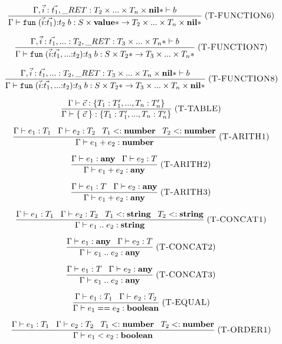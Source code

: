 \documentclass[12pt]{article}
\newcommand{\Top}{\mathbf{value}}
\newcommand{\Any}{\mathbf{any}}
\newcommand{\Nil}{\mathbf{nil}}
\newcommand{\Boolean}{\mathbf{boolean}}
\newcommand{\Number}{\mathbf{number}}
\newcommand{\String}{\mathbf{string}}
\newcommand{\kw}[1]{\mathbf{\texttt{#1}}}
\newcommand{\mylabel}[1]{\; (\textsc{#1})}
\newcommand{\subtype}{<:}
\newcommand{\env}{\Gamma}
\newcommand{\ret}{\string_RET}
\begin{document}
\[
\frac{\env, \vec{i}:\vec{t_{1}},
      \ret:T_{2} \times ... \times T_{n} \times \Nil{*} \vdash b}
     {\env \vdash \kw{fun} \; (\vec{i}{:}\vec{t_{1}}){:}t_{2} \; b :
      S \times \Top{*} \rightarrow T_{2} \times ... \times T_{n} \times \Nil{*}}
\mylabel{T-FUNCTION6}
\]

\[
\frac{\env, \vec{i}:\vec{t_{1}}, {...}:T_{2},
      \ret:T_{3} \times ... \times T_{n}* \vdash b}
     {\env \vdash \kw{fun} \; (\vec{i}{:}\vec{t_{1}},{...}{:}t_{2}){:}t_{3} \; b :
      S \times T_{2}* \rightarrow T_{3} \times ... \times T_{n}*}
\mylabel{T-FUNCTION7}
\]

\[
\frac{\env, \vec{i}:\vec{t_{1}}, {...}:T_{2},
      \ret:T_{3} \times ... \times T_{n} \times \Nil{*} \vdash b}
     {\env \vdash \kw{fun} \; (\vec{i}{:}\vec{t_{1}},{...}{:}t_{2}){:}t_{3} \; b :
      S \times T_{2}* \rightarrow T_{3} \times ... \times T_{n} \times \Nil{*}}
\mylabel{T-FUNCTION8}
\]

\[
\frac{\env \vdash \vec{c} : \{ T_{1}:T_{1}', ..., T_{n}:T_{n}' \}}
     {\env \vdash \{ \; \vec{c} \; \} : \{ T_{1}:T_{1}', ..., T_{n}:T_{n}' \}}
\mylabel{T-TABLE}
\]

\[
\frac{\env \vdash e_{1}:T_{1} \;\;\;
      \env \vdash e_{2}:T_{2} \;\;\;
      T_{1} \subtype \Number \;\;\;
      T_{2} \subtype \Number}
     {\env \vdash e_{1} + e_{2} : \Number}
\mylabel{T-ARITH1}
\]

\[
\frac{\env \vdash e_{1}:\Any \;\;\;
      \env \vdash e_{2}:T}
     {\env \vdash e_{1} + e_{2} : \Any}
\mylabel{T-ARITH2}
\]

\[
\frac{\env \vdash e_{1}:T \;\;\;
      \env \vdash e_{2}:\Any}
     {\env \vdash e_{1} + e_{2} : \Any}
\mylabel{T-ARITH3}
\]

\[
\frac{\env \vdash e_{1}:T_{1} \;\;\;
      \env \vdash e_{2}:T_{2} \;\;\;
      T_{1} \subtype \String \;\;\;
      T_{2} \subtype \String}
     {\env \vdash e_{1} \; {..} \; e_{2} : \String}
\mylabel{T-CONCAT1}
\]

\[
\frac{\env \vdash e_{1}:\Any \;\;\;
      \env \vdash e_{2}:T}
     {\env \vdash e_{1} \; {..} \; e_{2} : \Any}
\mylabel{T-CONCAT2}
\]

\[
\frac{\env \vdash e_{1}:T \;\;\;
      \env \vdash e_{2}:\Any}
     {\env \vdash e_{1} \; {..} \; e_{2} : \Any}
\mylabel{T-CONCAT3}
\]

\[
\frac{\env \vdash e_{1}:T_{1} \;\;\;
      \env \vdash e_{2}:T_{2}}
     {\env \vdash e_{1} == e_{2} : \Boolean}
\mylabel{T-EQUAL}
\]

\[
\frac{\env \vdash e_{1}:T_{1} \;\;\;
      \env \vdash e_{2}:T_{2} \;\;\;
      T_{1} \subtype \Number \;\;\;
      T_{2} \subtype \Number}
     {\env \vdash e_{1} < e_{2} : \Boolean}
\mylabel{T-ORDER1}
\]
\end{document}
